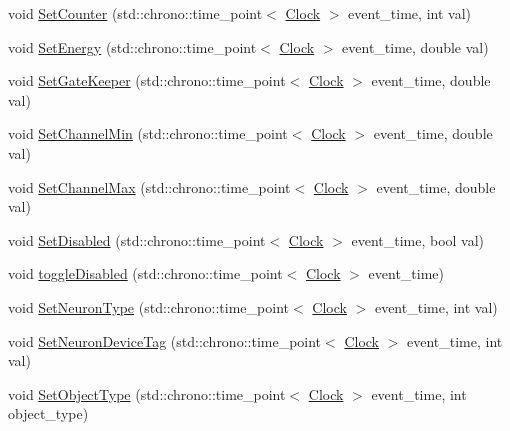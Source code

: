 \begin{DoxyCompactItemize}
\item 
void \mbox{\hyperlink{classNeuron_a92f942f6f0bd783c39bb550cf4bb8fd0}{Set\+Counter}} (std\+::chrono\+::time\+\_\+point$<$ \mbox{\hyperlink{universe_8h_a0ef8d951d1ca5ab3cfaf7ab4c7a6fd80}{Clock}} $>$ event\+\_\+time, int val)
\item 
void \mbox{\hyperlink{classNeuron_a5efa690ce4d8ff2f8dfb1fbfd84c5279}{Set\+Energy}} (std\+::chrono\+::time\+\_\+point$<$ \mbox{\hyperlink{universe_8h_a0ef8d951d1ca5ab3cfaf7ab4c7a6fd80}{Clock}} $>$ event\+\_\+time, double val)
\item 
void \mbox{\hyperlink{classNeuron_a492f597021faf1b74942bc75364c3c22}{Set\+Gate\+Keeper}} (std\+::chrono\+::time\+\_\+point$<$ \mbox{\hyperlink{universe_8h_a0ef8d951d1ca5ab3cfaf7ab4c7a6fd80}{Clock}} $>$ event\+\_\+time, double val)
\item 
void \mbox{\hyperlink{classNeuron_ae463ad8173c63e7970a5f4594667d481}{Set\+Channel\+Min}} (std\+::chrono\+::time\+\_\+point$<$ \mbox{\hyperlink{universe_8h_a0ef8d951d1ca5ab3cfaf7ab4c7a6fd80}{Clock}} $>$ event\+\_\+time, double val)
\item 
void \mbox{\hyperlink{classNeuron_aed1ba99e24b905cd91a519c33b5a62b0}{Set\+Channel\+Max}} (std\+::chrono\+::time\+\_\+point$<$ \mbox{\hyperlink{universe_8h_a0ef8d951d1ca5ab3cfaf7ab4c7a6fd80}{Clock}} $>$ event\+\_\+time, double val)
\item 
void \mbox{\hyperlink{classNeuron_af9ad96e27f7692e9e328d90e4c96977a}{Set\+Disabled}} (std\+::chrono\+::time\+\_\+point$<$ \mbox{\hyperlink{universe_8h_a0ef8d951d1ca5ab3cfaf7ab4c7a6fd80}{Clock}} $>$ event\+\_\+time, bool val)
\item 
void \mbox{\hyperlink{classNeuron_a32fe82aa21f8a68392d696eea3a34c99}{toggle\+Disabled}} (std\+::chrono\+::time\+\_\+point$<$ \mbox{\hyperlink{universe_8h_a0ef8d951d1ca5ab3cfaf7ab4c7a6fd80}{Clock}} $>$ event\+\_\+time)
\item 
void \mbox{\hyperlink{classNeuron_afc685a0444425fceab6685a6ee004b65}{Set\+Neuron\+Type}} (std\+::chrono\+::time\+\_\+point$<$ \mbox{\hyperlink{universe_8h_a0ef8d951d1ca5ab3cfaf7ab4c7a6fd80}{Clock}} $>$ event\+\_\+time, int val)
\item 
void \mbox{\hyperlink{classNeuron_aa06d0f1a129e4a901a60e7343bc43533}{Set\+Neuron\+Device\+Tag}} (std\+::chrono\+::time\+\_\+point$<$ \mbox{\hyperlink{universe_8h_a0ef8d951d1ca5ab3cfaf7ab4c7a6fd80}{Clock}} $>$ event\+\_\+time, int val)
\item 
void \mbox{\hyperlink{classNeuron_ab371e2dacf2cdde8db5547b72fb45ca1}{Set\+Object\+Type}} (std\+::chrono\+::time\+\_\+point$<$ \mbox{\hyperlink{universe_8h_a0ef8d951d1ca5ab3cfaf7ab4c7a6fd80}{Clock}} $>$ event\+\_\+time, int object\+\_\+type)

\end{DoxyCompactItemize}
